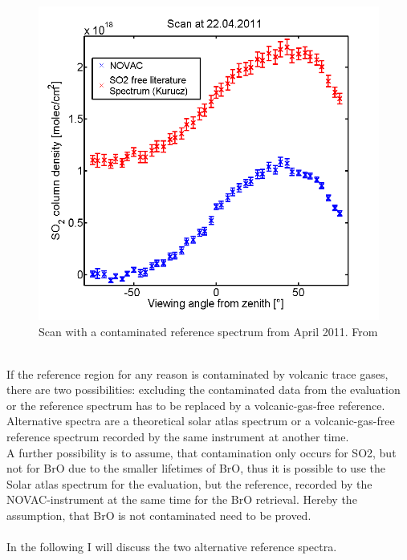 \begin{figure}
	\centering
	\includegraphics[width=0.7\linewidth]{Bilder/contaminated}
	\caption{Scan with a contaminated reference spectrum from April 2011. From \cite{WarnachSimon}}
	\label{fig:contaminated}
\end{figure}
\\
If the reference region for any reason is
contaminated by volcanic trace gases, there are two possibilities: excluding the contaminated data from the evaluation or the reference spectrum has to be
replaced by a volcanic-gas-free reference. Alternative spectra are a
theoretical solar atlas spectrum or a volcanic-gas-free reference
spectrum recorded by the same instrument at another time.\\
A further possibility is to assume, that contamination only occurs for SO2, but not for BrO due to the smaller lifetimes of BrO, thus it is possible to use the Solar atlas spectrum for the  evaluation, but the reference, recorded by the NOVAC-instrument at the same time for the BrO retrieval. Hereby the assumption, that BrO is not contaminated need to be proved. \\
%
\\
%
In the following I will discuss the two alternative reference spectra.
%
